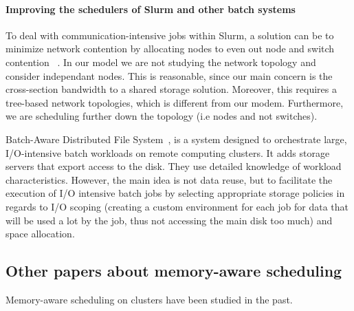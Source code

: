 \documentclass[conference,10pt]{IEEEtran}
\begin{document}
\paragraph{Improving the schedulers of Slurm and other batch systems}

To deal with communication-intensive jobs within Slurm, a solution can be to
minimize network contention by allocating nodes to even out node and switch contention
~\cite{minimize_network_contention}. 
In our model we are not studying the network topology and consider independant nodes.
This is reasonable, since our main concern is the cross-section bandwidth to a shared storage solution.
Moreover, this requires a tree-based network topologies, which is different from our modem.
Furthermore, we are scheduling further down the topology (i.e nodes and not switches).

Batch-Aware Distributed File System~\cite{Explicit_Control_in_a_Batch-Aware_Distributed_File_System},
is a system designed to orchestrate large, I/O-intensive batch workloads on remote computing clusters.
It adds storage servers that export access to the disk.
They use detailed knowledge of workload characteristics.
However, the main idea is not data reuse, but to
facilitate the execution of I/O intensive batch
jobs by selecting appropriate storage policies
in regards to I/O scoping (creating a custom environment for each job
for data that will be used a lot by the job, thus not accessing the main disk too
much) and space allocation.


\subsection{Other papers about memory-aware scheduling}
Memory-aware scheduling on clusters have been studied in the past.
 
\end{document}
